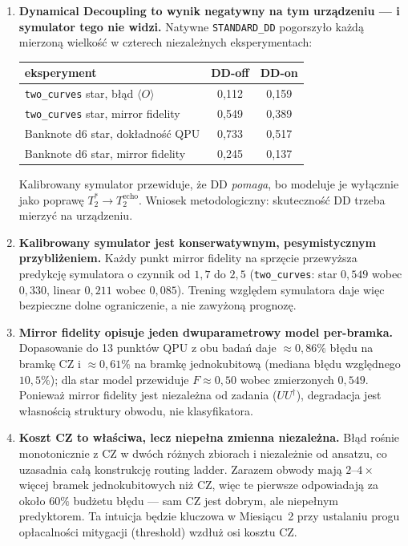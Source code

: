 \documentclass[11pt,a4paper]{article}
\begin{document}
\begin{enumerate}
\item \textbf{Dynamical Decoupling to wynik negatywny na tym urządzeniu --- i symulator tego
      nie widzi.} Natywne \texttt{STANDARD\_DD} pogorszyło każdą mierzoną wielkość w czterech
      niezależnych eksperymentach:
      \begin{center}
      \begin{tabular}{@{}lcc@{}}
      \toprule
      eksperyment & DD-off & DD-on \\
      \midrule
      \texttt{two\_curves} star, błąd $\langle O\rangle$        & 0,112 & 0,159 \\
      \texttt{two\_curves} star, mirror fidelity                 & 0,549 & 0,389 \\
      Banknote d6 star, dokładność QPU                           & 0,733 & 0,517 \\
      Banknote d6 star, mirror fidelity                          & 0,245 & 0,137 \\
      \bottomrule
      \end{tabular}
      \end{center}
      Kalibrowany symulator przewiduje, że DD \emph{pomaga}, bo modeluje je wyłącznie jako
      poprawę $T_2^{*}\to T_2^{\text{echo}}$. Wniosek metodologiczny: skuteczność DD trzeba
      mierzyć na urządzeniu.

\item \textbf{Kalibrowany symulator jest konserwatywnym, pesymistycznym przybliżeniem.}
      Każdy punkt mirror fidelity na sprzęcie przewyższa predykcję symulatora o czynnik od
      $1{,}7$ do $2{,}5$ (\texttt{two\_curves}: star $0{,}549$ wobec $0{,}330$, linear
      $0{,}211$ wobec $0{,}085$). Trening względem symulatora daje więc bezpieczne dolne
      ograniczenie, a nie zawyżoną prognozę.

\item \textbf{Mirror fidelity opisuje jeden dwuparametrowy model per-bramka.} Dopasowanie do
      13 punktów QPU z obu badań daje $\approx0{,}86\%$ błędu na bramkę CZ i $\approx0{,}61\%$
      na bramkę jednokubitową (mediana błędu względnego $10{,}5\%$); dla star model przewiduje
      $F\approx0{,}50$ wobec zmierzonych $0{,}549$. Ponieważ mirror fidelity jest niezależna od
      zadania ($U U^{\dagger}$), degradacja jest własnością struktury obwodu, nie
      klasyfikatora.

\item \textbf{Koszt CZ to właściwa, lecz niepełna zmienna niezależna.} Błąd rośnie
      monotonicznie z CZ w dwóch różnych zbiorach i niezależnie od ansatzu, co uzasadnia całą
      konstrukcję routing ladder. Zarazem obwody mają $2$--$4\times$ więcej bramek
      jednokubitowych niż CZ, więc te pierwsze odpowiadają za około $60\%$ budżetu błędu ---
      sam CZ jest dobrym, ale niepełnym predyktorem. Ta intuicja będzie kluczowa w Miesiącu~2
      przy ustalaniu progu opłacalności mitygacji (threshold) wzdłuż osi kosztu CZ.


\end{enumerate}
\end{document}
